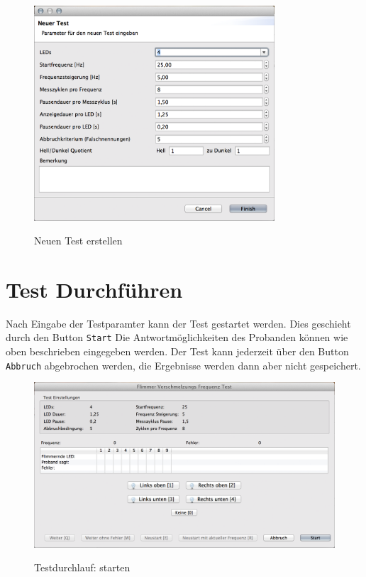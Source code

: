 \documentclass[11pt,accentcolor=tud2a,colorback,noheadingspace,bigchapter]{tudreport}
\begin{document}
\begin{figure}[H]
	\centering
	\includegraphics[width=0.8\textwidth]{test_dialog.png}
	\label{fig:test-new}
	\caption{Neuen Test erstellen}
\end{figure}

\section{Test Durchführen}
\label{tests:test-durchfuhren}\label{tests:test-run}
Nach Eingabe der Testparamter kann der Test gestartet werden. Dies geschieht durch den Button \texttt{Start} Die Antwortmöglichkeiten des Probanden können wie oben beschrieben eingegeben werden. Der Test kann jederzeit über den Button \texttt{Abbruch} abgebrochen werden, die Ergebnisse werden dann aber nicht gespeichert.

\begin{figure}[H]
	\centering
	\includegraphics[width=\textwidth]{testrunner_dialog.png}
	\label{fig:testrunner-dialog}
	\caption{Testdurchlauf: starten}
\end{figure}
\end{document}

